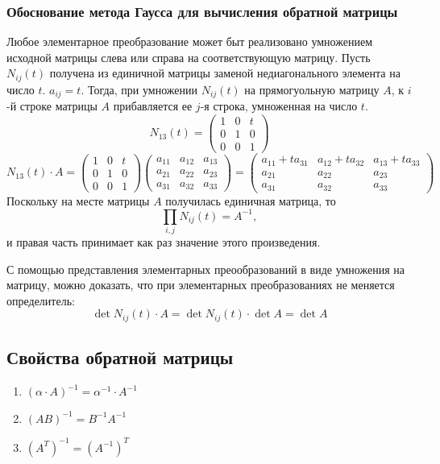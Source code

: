 \documentclass[12pt, a4paper]{article}
\begin{document}
    \subsubsection{Обоснование метода Гаусса для вычисления обратной матрицы}
    Любое элементарное преобразование может быт реализовано умножением исходной матрицы слева или справа на соответствующую матрицу. Пусть \( N_{ij}(t) \) получена из единичной матрицы заменой недиагонального элемента на число \( t \). \( a_{ij} = t \). Тогда, при умножении \( N_{ij}(t) \) на прямогуольную матрицу \( A \), к \( i \)-й строке матрицы \( A \) прибавляется ее \( j \)-я строка, умноженная на число \( t \). \[
        N_{13}(t) = \begin{pmatrix} 1 & 0 & t \\ 0 & 1 & 0 \\ 0 & 0 & 1 \end{pmatrix} 
    \] \[
        N_{13}(t) \cdot A = \begin{pmatrix} 1 & 0 & t \\ 0 & 1 & 0 \\ 0 & 0 & 1 \end{pmatrix} \begin{pmatrix} a_{11} & a_{12} & a_{13} \\ a_{21} & a_{22} & a_{23} \\ a_{31}& a_{32}& a_{33} \end{pmatrix} = \begin{pmatrix}  a_{11} + ta_{31} & a_{12} + ta_{32} & a_{13} + ta_{33} \\ a_{21} & a_{22} & a_{23} \\ a_{31}& a_{32}& a_{33}\end{pmatrix} 
    \] Поскольку на месте матрицы \( A \) получилась единичная матрица, то \[
        \prod_{i, j} N_{ij}(t) = A^{-1},
    \] и правая часть принимает как раз значение этого произведения. 

    \begin{rem}
        С помощью представления элементарных преообразований в виде умножения на матрицу, можно доказать, что при элементарных преобразованиях не меняется определитель: \[
            \det N_{ij}(t) \cdot A = \det N_{ij}(t) \cdot \det A = \det A
        \] 
    \end{rem}
    \subsection{Свойства обратной матрицы}
    \begin{enumerate}
        \item \( (\alpha \cdot A)^{-1} = \alpha ^{-1} \cdot A^{-1} \)
        \item \( (AB)^{-1} = B^{-1}A^{-1} \)
        \item \( (A^{T})^{-1} = (A^{-1})^{T}  \)
    \end{enumerate}
\end{document}
